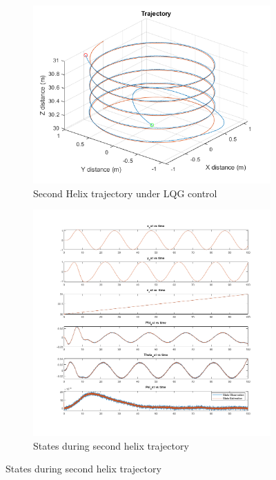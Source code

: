 \documentclass[conf]{new-aiaa}
\begin{document}
\begin{doublespace}
\begin{singlespace}
\begin{figure}[!htpb]
\begin{subfigure}{.5\textwidth}
  \centering
  \includegraphics[scale= 0.65]{LQGhelix_2.png}
  \caption{Second Helix trajectory under LQG control}
  \label{LQGhelix_2}
\end{subfigure}%
\begin{subfigure}{.5\textwidth}
  \centering
  \includegraphics[scale= 0.4]{LQGhelix_2_state.png}
  \caption{States during second helix trajectory}
  \label{LQGhelix_2_state}
\end{subfigure}%
\end{figure}


\end{singlespace}
\end{doublespace}
\end{document}
